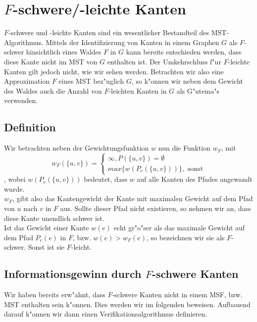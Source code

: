 \section{$F$-schwere/-leichte Kanten}

$F$-schwere und -leichte Kanten sind ein wesentlicher Bestandteil des 
    MST-Algorithmus. Mittels der Identifizierung von Kanten in einem Graphen $G$
    als $F$-schwer hinsichtlich eines Waldes $F$ in $G$ kann
    bereits entschieden werden, dass diese Kante nicht im MST von $G$ enthalten
    ist. Der Umkehrschluss f"ur $F$-leichte Kanten gilt jedoch nicht, wie wir
    sehen werden.
    Betrachten wir also eine Approximation $F$ eines MST bez"uglich $G$, so k"onnen
    wir neben dem Gewicht des Waldes auch die Anzahl von $F$-leichten Kanten in $G$ als
    G"utema"s verwenden.\\

\subsection{Definition}

Wir betrachten neben der Gewichtungsfunktion $w$ nun die Funktion $w_F$, mit
    $$
    w_F(\{u,v\}) =  \begin{cases}
                        \infty, P(\{u,v\}) = \emptyset\\
                        max\{w(P_e(\{u,v\}))\}, \text{ sonst}
                    \end{cases}
    $$
, wobei $w(P_e(\{u,v\}))$ bedeutet, dass $w$ auf alle Kanten des Pfades angewandt
    wurde.\\
$w_F$, gibt also das Kantengewicht der Kante mit maximalen Gewicht auf dem
    Pfad von $u$ nach $v$ in $F$ aus. Sollte dieser Pfad nicht existieren, so
    nehmen wir an, dass diese Kante unendlich schwer ist.\\
Ist das Gewicht einer Kante $w(e)$ echt gr"o"ser als das maximale Gewicht auf dem 
    Pfad $P_e(e)$ in $F$, bzw. $w(e) > w_F(e)$, 
    so bezeichnen wir sie als $F$-schwer.
    Sonst ist sie $F$-leicht.

\subsection{Informationsgewinn durch $F$-schwere Kanten}

Wir haben bereits erw"ahnt, dass $F$-schwere Kanten nicht in einem MSF, bzw. MST
    enthalten sein k"onnen.
    Dies werden wir im folgenden beweisen.
    Aufbauend darauf k"onnen wir dann einen Verifikationsalgorithmus definieren.\\

